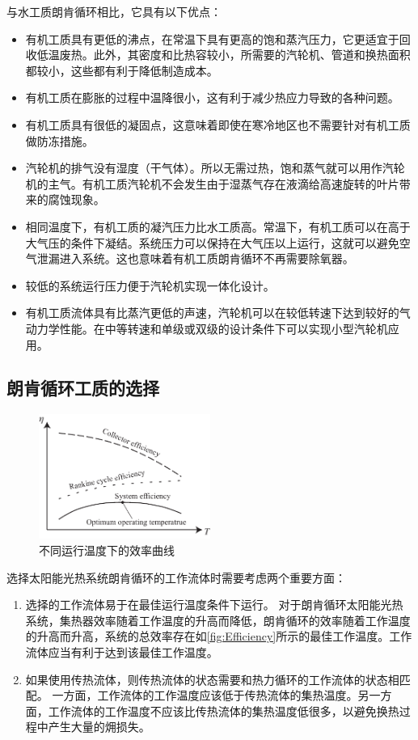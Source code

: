 与水工质朗肯循环相比，它具有以下优点：
\begin{itemize}
    \item 有机工质具有更低的沸点，在常温下具有更高的饱和蒸汽压力，它更适宜于回收低温废热。此外，其密度和比热容较小，所需要的汽轮机、管道和换热面积都较小，这些都有利于降低制造成本。
    \item 有机工质在膨胀的过程中温降很小，这有利于减少热应力导致的各种问题。
    \item 有机工质具有很低的凝固点，这意味着即使在寒冷地区也不需要针对有机工质做防冻措施。
    \item 汽轮机的排气没有湿度（干气体）。所以无需过热，饱和蒸气就可以用作汽轮机的主气。有机工质汽轮机不会发生由于湿蒸气存在液滴给高速旋转的叶片带来的腐蚀现象。
    \item 相同温度下，有机工质的凝汽压力比水工质高。常温下，有机工质可以在高于大气压的条件下凝结。系统压力可以保持在大气压以上运行，这就可以避免空气泄漏进入系统。这也意味着有机工质朗肯循环不再需要除氧器。
    \item 较低的系统运行压力便于汽轮机实现一体化设计。
    \item 有机工质流体具有比蒸汽更低的声速，汽轮机可以在较低转速下达到较好的气动力学性能。在中等转速和单级或双级的设计条件下可以实现小型汽轮机应用。
  \end{itemize}
  
\subsection{朗肯循环工质的选择}
\begin{figure}[!ht]
\centering 
\includegraphics[width=0.5\textwidth]{fig/Efficiency}
\caption{不同运行温度下的效率曲线}\label{fig:Efficiency}
\end{figure}
选择太阳能光热系统朗肯循环的工作流体时需要考虑两个重要方面：
\begin{enumerate}
  \item 选择的工作流体易于在最佳运行温度条件下运行。
 对于朗肯循环太阳能光热系统，集热器效率随着工作温度的升高而降低，朗肯循环的效率随着工作温度的升高而升高，系统的总效率存在如\autoref{fig:Efficiency}所示的最佳工作温度。工作流体应当有利于达到该最佳工作温度。    
  \item 如果使用传热流体，则传热流体的状态需要和热力循环的工作流体的状态相匹配。
  一方面，工作流体的工作温度应该低于传热流体的集热温度。另一方面，工作流体的工作温度不应该比传热流体的集热温度低很多，以避免换热过程中产生大量的㶲损失。
\end{enumerate}

